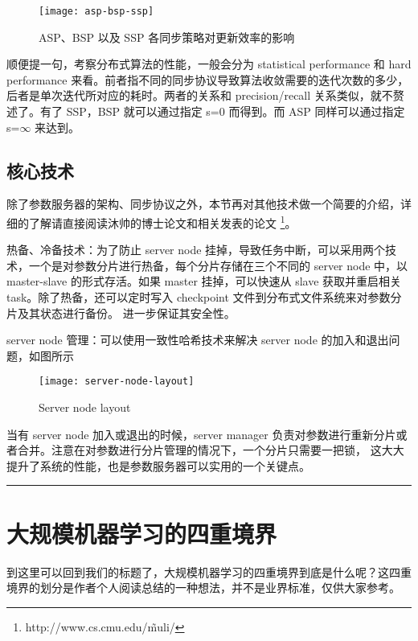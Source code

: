 \begin{figure}[hbtp]
\centering
\texttt{[image: asp-bsp-ssp]}
\caption{ASP、BSP 以及 SSP 各同步策略对更新效率的影响}
\end{figure}

顺便提一句，考察分布式算法的性能，一般会分为 statistical performance 和 hard performance 来看。前者指不同的同步协议导致算法收敛需要的迭代次数的多少，
后者是单次迭代所对应的耗时。两者的关系和 precision/recall 关系类似，就不赘述了。有了 SSP，BSP 就可以通过指定 s=0 而得到。而 ASP 同样可以通过指定
s=$\infty$ 来达到。

\subsection{核心技术}\label{subsec:ps-cores}

除了参数服务器的架构、同步协议之外，本节再对其他技术做一个简要的介绍，详细的了解请直接阅读沐帅的博士论文和相关发表的论文%
\footnote{http://www.cs.cmu.edu/\~muli/}。

热备、冷备技术：为了防止 server node 挂掉，导致任务中断，可以采用两个技术，一个是对参数分片进行热备，每个分片存储在三个不同的 server node 中，以 master-slave 的形式存活。如果 master 挂掉，可以快速从 slave 获取并重启相关 task。除了热备，还可以定时写入 checkpoint 文件到分布式文件系统来对参数分片及其状态进行备份。
进一步保证其安全性。

server node 管理：可以使用一致性哈希技术来解决 server node 的加入和退出问题，如图所示 

\begin{figure}[hbtp]
\centering
\texttt{[image: server-node-layout]}
\caption{Server node layout}
\end{figure}

当有 server node 加入或退出的时候，server manager 负责对参数进行重新分片或者合并。注意在对参数进行分片管理的情况下，一个分片只需要一把锁，
这大大提升了系统的性能，也是参数服务器可以实用的一个关键点。


\noindent\rule[0.25\baselineskip]{\textwidth}{1pt}

\section{大规模机器学习的四重境界}\label{sec:three-of-four}

到这里可以回到我们的标题了，大规模机器学习的四重境界到底是什么呢？这四重境界的划分是作者个人阅读总结的一种想法，并不是业界标准，仅供大家参考。

